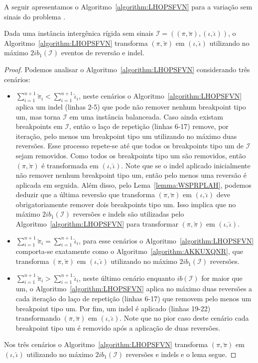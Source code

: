 A seguir apresentamos o Algoritmo~\ref{algorithm:LHOPSFVN} para a variação sem sinais do problema \SbIRI{}.



\begin{lemma}\label{lemma:XUDIVWPC}
Dada uma instância intergênica rígida sem sinais $\mathcal{I}=((\pi,\breve\pi),(\iota,\breve\iota))$, o Algoritmo~\ref{algorithm:LHOPSFVN} transforma $(\pi,\breve\pi)$ em $(\iota,\breve\iota)$ utilizando no máximo $2ib_1(\mathcal{I})$ eventos de reversão e indel.
\end{lemma}
\begin{proof}
  Podemos analisar o Algoritmo~\ref{algorithm:LHOPSFVN} considerando três cenários:
  \begin{itemize}
    \item $\sum_{i=1}^{n+1}\breve\pi_i < \sum_{i=1}^{n+1}\breve\iota_i$, neste cenários o Algoritmo~\ref{algorithm:LHOPSFVN} aplica um indel (linhas 2-5) que pode não remover nenhum breakpoint tipo um, mas torna $\mathcal{I}$ em uma instância balanceada. Caso ainda existam breakpoints em $\mathcal{I}$, então o laço de repetição (linhas 6-17) remove, por iteração, pelo menos um breakpoint tipo um utilizando no máximo duas reversões. Esse processo repete-se até que todos os breakpoints tipo um de $\mathcal{I}$ sejam removidos. Como todos os breakpoints tipo um são removidos, então $(\pi,\breve\pi)$ é transformada em $(\iota,\breve\iota)$. Note que se o indel aplicado inicialmente não remover nenhum breakpoint tipo um, então pelo menos uma reversão é aplicada em seguida. Além disso, pelo Lema~\ref{lemma:WSPRPLAH}, podemos deduzir que a última reversão que transforma $(\pi,\breve\pi)$ em $(\iota,\breve\iota)$ deve obrigatoriamente remover dois breakpoints tipo um. Isso implica que no máximo $2ib_1(\mathcal{I})$ reversões e indels são utilizadas pelo Algoritmo~\ref{algorithm:LHOPSFVN} para transformar $(\pi,\breve\pi)$ em $(\iota,\breve\iota)$.
    \item $\sum_{i=1}^{n+1}\breve\pi_i = \sum_{i=1}^{n+1}\breve\iota_i$, para esse cenários o Algoritmo~\ref{algorithm:LHOPSFVN} comporta-se exatamente como o Algoritmo~\ref{algorithm:AKKUXQNR}, que transforma $(\pi,\breve\pi)$ em $(\iota,\breve\iota)$ utilizando no máximo $2ib_1(\mathcal{I})$ reversões.
    \item $\sum_{i=1}^{n+1}\breve\pi_i > \sum_{i=1}^{n+1}\breve\iota_i$, neste último cenário enquanto $ib(\mathcal{I})$ for maior que um, o Algoritmo~\ref{algorithm:LHOPSFVN} aplica no máximo duas reversões a cada iteração do laço de repetição (linhas 6-17) que removem pelo menos um breakpoint tipo um. Por fim, um indel é aplicado (linhas 19-22) transformando $(\pi,\breve\pi)$ em $(\iota,\breve\iota)$. Note que no pior caso deste cenário cada breakpoint tipo um é removido após a aplicação de duas reversões.
  \end{itemize}
  Nos três cenários o Algoritmo~\ref{algorithm:LHOPSFVN} transforma $(\pi,\breve\pi)$ em $(\iota,\breve\iota)$ utilizando no máximo $2ib_1(\mathcal{I})$ reversões e indels e o lema segue.
\end{proof}


